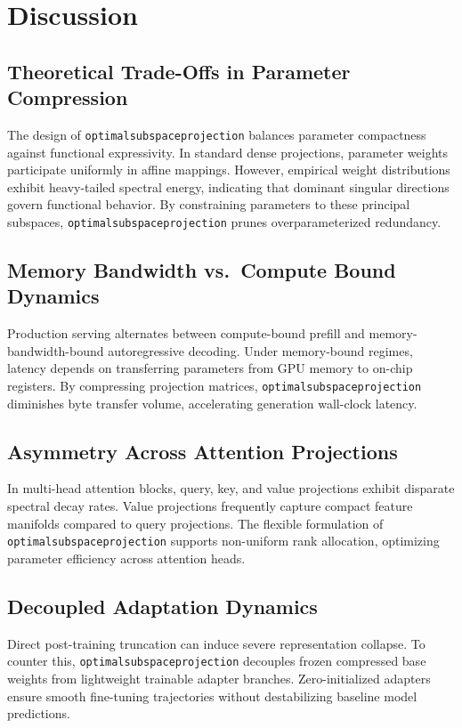 \section{Discussion}

\subsection{Theoretical Trade-Offs in Parameter Compression}
The design of \texttt{optimalsubspaceprojection} balances parameter compactness against functional expressivity. In standard dense projections, parameter weights participate uniformly in affine mappings. However, empirical weight distributions exhibit heavy-tailed spectral energy, indicating that dominant singular directions govern functional behavior. By constraining parameters to these principal subspaces, \texttt{optimalsubspaceprojection} prunes overparameterized redundancy.

\subsection{Memory Bandwidth vs.\ Compute Bound Dynamics}
Production serving alternates between compute-bound prefill and memory-bandwidth-bound autoregressive decoding. Under memory-bound regimes, latency depends on transferring parameters from GPU memory to on-chip registers. By compressing projection matrices, \texttt{optimalsubspaceprojection} diminishes byte transfer volume, accelerating generation wall-clock latency.

\subsection{Asymmetry Across Attention Projections}
In multi-head attention blocks, query, key, and value projections exhibit disparate spectral decay rates. Value projections frequently capture compact feature manifolds compared to query projections. The flexible formulation of \texttt{optimalsubspaceprojection} supports non-uniform rank allocation, optimizing parameter efficiency across attention heads.

\subsection{Decoupled Adaptation Dynamics}
Direct post-training truncation can induce severe representation collapse. To counter this, \texttt{optimalsubspaceprojection} decouples frozen compressed base weights from lightweight trainable adapter branches. Zero-initialized adapters ensure smooth fine-tuning trajectories without destabilizing baseline model predictions.

